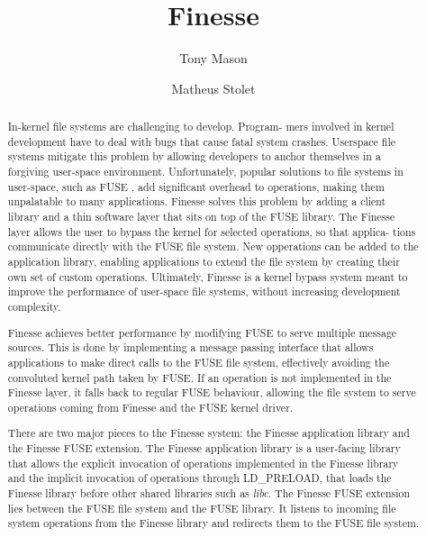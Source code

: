 \documentclass[sigplan,screen]{acmart}
\begin{document}
\title{Finesse}

\author{Tony Mason}


\author{Matheus Stolet}

\begin{abstract}
  In-kernel file systems are challenging to develop. Program-
  mers involved in kernel development have to deal with bugs
  that cause fatal system crashes. Userspace file systems mitigate
  this problem by allowing developers to anchor themselves in
  a forgiving user-space environment. Unfortunately, popular
  solutions to file systems in user-space, such as FUSE \cite{fusegithub}, add
  significant overhead to operations, making them unpalatable
  to many applications. Finesse solves this problem
  by adding a client library and a thin software layer that sits
  on top of the FUSE library. The Finesse layer allows the user
  to bypass the kernel for selected operations, so that applica-
  tions communicate directly with the FUSE file system. New
  opperations can be added to the application library, enabling
  applications to extend the file system by creating their own set
  of custom operations. Ultimately, Finesse is a kernel
  bypass system meant to improve the performance of user-space file
  systems, without increasing development complexity.

  Finesse achieves better performance by modifying FUSE
  to serve multiple message sources. This is done by implementing
  a message passing interface that allows applications to make direct
  calls to the FUSE file system, effectively avoiding the convoluted kernel path
  taken by FUSE. If an operation is not implemented
  in the Finesse layer, it falls back to regular FUSE behaviour,
  allowing the file system to serve operations coming from Finesse
  and the FUSE kernel driver. 
  
  There are two major pieces to the Finesse
  system: the Finesse application library and the Finesse FUSE extension. 
  The Finesse application library is a user-facing library that allows the explicit
  invocation of operations implemented in the Finesse library and the implicit invocation
  of operations through LD\_PRELOAD, that loads the Finesse library before other shared libraries such as
  \textit{libc}. The Finesse FUSE extension lies between the FUSE file system and the FUSE library.
  It listens to incoming file system operations from the Finesse library and redirects them to the
  FUSE file system.


\end{abstract}
\end{document}
